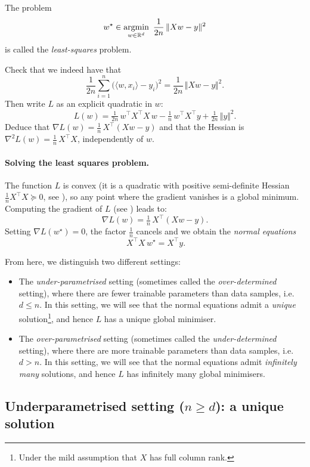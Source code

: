 \noindent
The problem
\[
w^\star \in \operatorname*{argmin}_{w \in \mathbb{R}^d} \ \frac{1}{2n}\, \Vert X w - y \Vert^2
\]
is called the \emph{least-squares} problem.

\begin{exercise}[$\star \star$]
Check that we indeed have that 
\[
\frac{1}{2n} \sum_{i=1}^n \big( \langle w, x_i \rangle - y_i \big)^2
   = \frac{1}{2n} \, \Vert X w - y \Vert^2 .
\]
Then write $L$ as an explicit quadratic in $w$:
\[
L(w) = \tfrac{1}{2n}\, w^\top X^\top X\, w - \tfrac{1}{n}\, w^\top X^\top y + \tfrac{1}{2n}\, \Vert y \Vert^2 .
\]
Deduce that $\nabla L(w) = \tfrac{1}{n}\, X^\top (X w - y)$ and that the Hessian is
$\nabla^2 L(w) = \tfrac{1}{n}\, X^\top X$, independently of $w$.
\end{exercise}

\paragraph{Solving the least squares problem.}
The function $L$ is convex (it is a quadratic with positive semi-definite
Hessian $\tfrac{1}{n} X^\top X \succeq 0$, see ), so any
point where the gradient vanishes is a global minimum. Computing the gradient of $L$ (see
) leads to:
\[
\nabla L(w) = \tfrac{1}{n}\, X^\top (X w - y) .
\]
Setting $\nabla L(w^\star) = 0$, the factor $\tfrac{1}{n}$ cancels and we obtain the
\emph{normal equations}
\[
\ X^\top X \, w^\star = X^\top y  .
\]

\noindent
From here, we distinguish two different settings:
\begin{itemize}
    \item The \emph{under-parametrised} setting (sometimes called the \textit{over-determined} setting), where there are fewer trainable parameters than data samples, i.e.\ $d \leq n$. In this setting, we will see that the normal equations admit a \emph{unique} solution\footnote{Under the mild assumption that $X$ has full column rank.}, and hence $L$ has a unique global minimiser.
    \item The \emph{over-parametrised} setting (sometimes called the \textit{under-determined} setting), where there are more trainable parameters than data samples, i.e.\ $d > n$. In this setting, we will see that the normal equations admit \emph{infinitely many} solutions, and hence $L$ has infinitely many global minimisers.
\end{itemize}

\subsection{Underparametrised setting ($n \geq d$): a unique solution}
\label{subsec:underparam}

